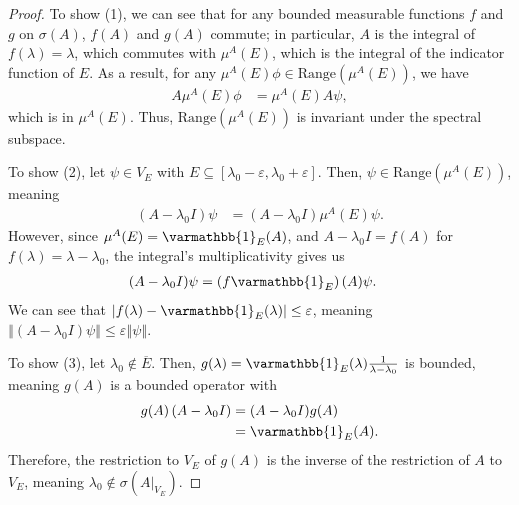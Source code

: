 \documentclass[12pt]{extarticle}
\newcommand{\norm}[1]{\left\Vert #1\right\Vert}
\theoremstyle{plain}
\theoremstyle{definition}
\theoremstyle{remark}
\renewcommand{\newline}{\hfill\break}
\begin{document}
  \begin{proof}
    To show (1), we can see that for any bounded measurable functions $f$ and $g$ on $\sigma(A)$, $f(A)$ and $g(A)$ commute; in particular, $A$ is the integral of $f(\lambda) = \lambda$, which commutes with $\mu^{A}(E)$, which is the integral of the indicator function of $E$. As a result, for any $\mu^{A}(E)\phi \in \text{Range}\left(\mu^{A}(E)\right)$, we have
    \begin{align*}
      A\mu^{A}(E)\phi &= \mu^{A}(E)A\psi,
    \end{align*}
    which is in $\mu^{A}(E)$. Thus, $\text{Range}\left(\mu^{A}(E)\right)$ is invariant under the spectral subspace.\newline

    To show (2), let $\psi \in V_E$ with $E \subseteq [\lambda_0 - \varepsilon,\lambda_0 + \varepsilon]$. Then, $\psi\in \text{Range}\left(\mu^{A}(E)\right)$, meaning
    \begin{align*}
      (A - \lambda_0 I)\psi &= (A - \lambda_0 I)\mu^{A}(E)\psi.
    \end{align*}
    However, since $\mu^{A}(E) = \varmathbb{1}_{E}(A)$, and $A - \lambda_0 I = f(A)$ for $f(\lambda) = \lambda - \lambda_0$, the integral's multiplicativity gives us
    \begin{align*}
      (A - \lambda_0 I)\psi &= \left(f\varmathbb{1}_{E}\right)(A)\psi.
    \end{align*}
    We can see that $\left\vert f(\lambda) - \varmathbb{1}_{E}(\lambda) \right\vert \leq \varepsilon$, meaning $\norm{(A - \lambda_0 I)\psi} \leq \varepsilon \norm{\psi}$.\newline

    To show (3), let $\lambda_0 \notin \overline{E}$. Then, $g(\lambda) = \varmathbb{1}_{E}(\lambda)\frac{1}{\lambda - \lambda_0}$ is bounded, meaning $g(A)$ is a bounded operator with
    \begin{align*}
      g(A)\left(A - \lambda_0 I\right) &= (A - \lambda_0 I)g(A)\\
                                       &= \varmathbb{1}_{E}(A).
    \end{align*}
    Therefore, the restriction to $V_E$ of $g(A)$ is the inverse of the restriction of $A$ to $V_E$, meaning $\lambda_0\notin \sigma\left(A\rvert_{V_E}\right)$.\newline


\end{proof}
\end{document}
